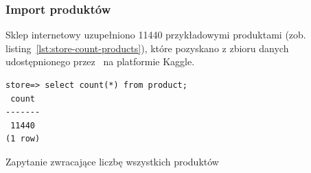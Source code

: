 \subsubsection{Import produktów}

Sklep internetowy uzupełniono 11440 przykładowymi produktami (zob. listing~\ref{lst:store-count-products}), które pozyskano z zbioru danych~\cite{fashion-dataset} udostępnionego przez~\citeauthor*{fashion-dataset} na platformie Kaggle.

\begin{listing}[H]
    \begin{verbatim}
store=> select count(*) from product;
 count
-------
 11440
(1 row)
    \end{verbatim}
    \caption{Zapytanie zwracające liczbę wszystkich produktów}
    \label{lst:store-count-products}
\end{listing}
